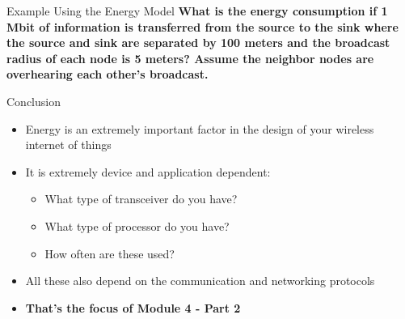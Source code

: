 \documentclass[aspectratio=169,11pt]{beamer}
\begin{document}
\begin{frame}{Example Using the Energy Model}
    \textbf{What is the energy consumption if 1 Mbit of information is transferred from the source to the sink where the source and sink are separated by 100 meters and the broadcast radius of each node is 5 meters? Assume the neighbor nodes are overhearing each other's broadcast.}
    
    \vspace{0.5cm}
    \begin{center}
    \end{center}
\end{frame}

\begin{frame}{Conclusion}
    \begin{itemize}
        \item Energy is an extremely important factor in the design of your wireless internet of things
        \item It is extremely device and application dependent:
        \begin{itemize}
            \item What type of transceiver do you have?
            \item What type of processor do you have?
            \item How often are these used?
        \end{itemize}
        \item All these also depend on the communication and networking protocols
        \item \textbf{That's the focus of Module 4 - Part 2}
    \end{itemize}
\end{frame}
\end{document}
